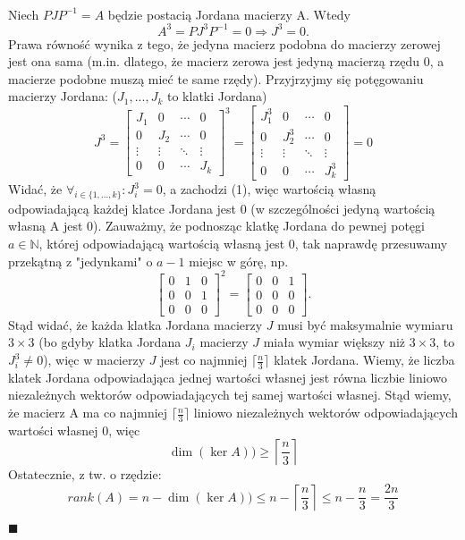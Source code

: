 \documentclass{article}
\begin{document}
\ 

Niech $PJP^{-1}=A$ będzie postacią Jordana macierzy A. Wtedy
$$A^3=PJ^3P^{-1}=0\Rightarrow J^3=0.$$
Prawa równość wynika z tego, że jedyna macierz podobna do macierzy zerowej jest ona sama (m.in. dlatego, że macierz zerowa jest jedyną macierzą rzędu 0, a macierze podobne muszą mieć te same rzędy). Przyjrzyjmy się potęgowaniu macierzy Jordana: ($J_1,...,J_k$ to klatki Jordana)
$$J^3=\left[\begin{array}{cccc}
J_1 & 0 & \cdots & 0 \\
0 & J_2 & \cdots & 0 \\
\vdots & \vdots & \ddots & \vdots \\
0 & 0 & \cdots & J_k 
\end{array}\right]^3=\left[\begin{array}{cccc}
J_1^3 & 0 & \cdots & 0 \\
0 & J_2^3 & \cdots & 0 \\
\vdots & \vdots & \ddots & \vdots \\
0 & 0 & \cdots & J_k^3 
\end{array}\right]=0$$
Widać, że $\forall_{i\in\{1,...,k\}}: J_i^3=0$, a zachodzi (1), więc wartością własną odpowiadającą każdej klatce Jordana jest 0 (w szczególności jedyną wartością własną A jest 0). Zauważmy, że podnosząc klatkę Jordana do pewnej potęgi $a\in\mathds{N}$, której odpowiadającą wartością własną jest 0, tak naprawdę przesuwamy przekątną z "jedynkami" o $a-1$ miejsc w górę, np.
$$\left[\begin{array}{ccc}
0 & 1 & 0 \\
0 & 0 & 1 \\
0 & 0 & 0 
\end{array}\right]^2=\left[\begin{array}{ccc}
0 & 0 & 1 \\
0 & 0 & 0 \\
0 & 0 & 0 
\end{array}\right].$$
Stąd widać, że każda klatka Jordana macierzy $J$ musi być maksymalnie wymiaru $3\times3$ (bo gdyby klatka Jordana $J_i$ macierzy $J$ miała wymiar większy niż $3\times3$, to $J_i^3\neq0$), więc w macierzy $J$ jest co najmniej $\lceil\frac{n}{3}\rceil$ klatek Jordana. Wiemy, że liczba klatek Jordana odpowiadająca jednej wartości własnej jest równa liczbie liniowo niezależnych wektorów odpowiadających tej samej wartości własnej. Stąd wiemy, że macierz A ma co najmniej $\lceil\frac{n}{3}\rceil$ liniowo niezależnych wektorów odpowiadających wartości własnej 0, więc $$\dim(\ker A))\geq\left\lceil\frac{n}{3}\right\rceil$$  
Ostatecznie, z tw. o rzędzie:
$$rank(A)=n-\dim(\ker A))\leq n-\left\lceil\frac{n}{3}\right\rceil\leq n-\frac{n}{3}=\frac{2n}{3}$$
\begin{flushright}
$\blacksquare$
\end{flushright}
\end{document}

